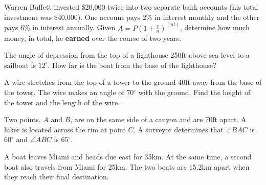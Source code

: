 \documentclass[../main.tex]{subfiles}
\begin{document}
\begin{questions}
    \question[1] Warren Buffett invested \$20,000 twice into two separate bank accounts (his total investment was \$40,000). One account pays 2\% in interest monthly and the other pays 6\% in interest annually. Given $A = P(1 + \frac{r}{n})^{(nt)}$, determine how much money, in total, he \textbf{earned} over the course of two years. 
    
    \question[1] The angle of depression from the top of a lighthouse 250ft above sea level to a sailboat is $12^\circ$. How far is the boat from the base of the lighthouse? 

    \question[1] A wire stretches from the top of a tower to the ground 40ft away from the base of the tower. The wire makes an angle of $70^\circ$ with the ground. Find the height of the tower and the length of the wire. 
    
    \newpage
    
    \question[1] Two points, $A$ and $B$, are on the same side of a canyon and are 70ft apart. A hiker is located across the rim at point $C$. A surveyor determines that $\angle BAC$ is $60^\circ$ and $\angle ABC$ is $65^\circ$.
     
    \question[1] A boat leaves Miami and heads due east for 35km. At the same time, a second boat also travels from Miami for 25km. The two boats are 15.2km apart when they reach their final destination.
\end{questions}
\end{document}
